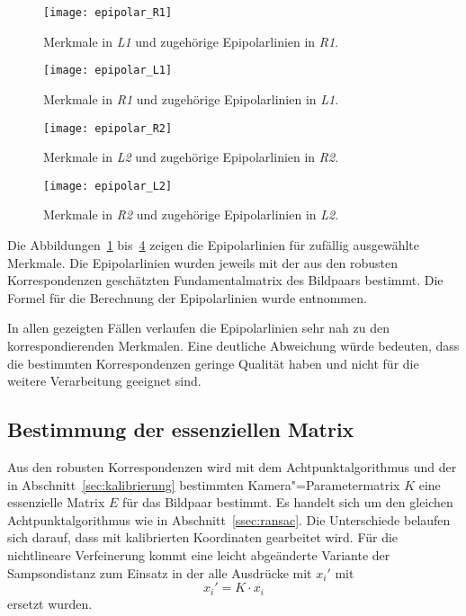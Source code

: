 \begin{figure}[!p]
	\centering
	\texttt{[image: epipolar\_R1]}
	\caption{Merkmale in \textit{L1} und zugehörige Epipolarlinien in \textit{R1}.}
	\label{fig:epipolar_r1}
\end{figure}

\begin{figure}[!p]
	\centering
	\texttt{[image: epipolar\_L1]}
	\caption{Merkmale in \textit{R1} und zugehörige Epipolarlinien in \textit{L1}.}
	\label{fig:epipolar_l1}
\end{figure}

\begin{figure}[!p]
	\centering
	\texttt{[image: epipolar\_R2]}
	\caption{Merkmale in \textit{L2} und zugehörige Epipolarlinien in \textit{R2}.}
	\label{fig:epipolar_r2}
\end{figure}

\begin{figure}[!p]
	\centering
	\texttt{[image: epipolar\_L2]}
	\caption{Merkmale in \textit{R2} und zugehörige Epipolarlinien in \textit{L2}.}
	\label{fig:epipolar_l2}
\end{figure}

Die Abbildungen~\ref{fig:epipolar_r1} bis~\ref{fig:epipolar_l2} zeigen die Epipolarlinien für zufällig ausgewählte Merkmale. Die Epipolarlinien wurden jeweils mit der aus den robusten Korrespondenzen geschätzten Fundamentalmatrix des Bildpaars bestimmt. Die Formel für die Berechnung der Epipolarlinien wurde \cite{Fusiello} entnommen.

In allen gezeigten Fällen verlaufen die Epipolarlinien sehr nah zu den korrespondierenden Merkmalen. Eine deutliche Abweichung würde bedeuten, dass die bestimmten Korrespondenzen geringe Qualität haben und nicht für die weitere Verarbeitung geeignet sind.

\subsection{Bestimmung der essenziellen Matrix}
Aus den robusten Korrespondenzen wird mit dem Achtpunktalgorithmus und der in Abschnitt~\ref{sec:kalibrierung} bestimmten Kamera"=Parametermatrix $K$ eine essenzielle Matrix $E$ für das Bildpaar bestimmt. Es handelt sich um den gleichen Achtpunktalgorithmus wie in Abschnitt~\ref{ssec:ransac}. Die Unterschiede belaufen sich darauf, dass mit kalibrierten Koordinaten gearbeitet wird. Für die nichtlineare Verfeinerung kommt eine leicht abgeänderte Variante der Sampsondistanz zum Einsatz in der alle Ausdrücke mit $x_i'$ mit
\begin{equation}
	x_i' = K \cdot x_i
\end{equation}
ersetzt wurden.

